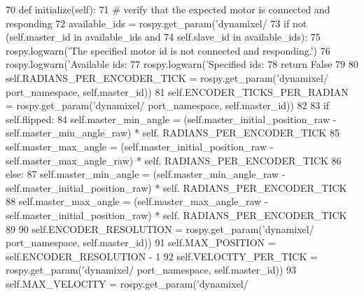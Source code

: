 \begin{DoxyCode}
70     \textcolor{keyword}{def }initialize(self):
71         \textcolor{comment}{# verify that the expected motor is connected and responding}
72         available\_ids = rospy.get\_param(\textcolor{stringliteral}{'dynamixel/%
73         \textcolor{keywordflow}{if} \textcolor{keywordflow}{not} (self.master\_id \textcolor{keywordflow}{in} available\_ids \textcolor{keywordflow}{and}
74                 self.slave\_id \textcolor{keywordflow}{in} available\_ids):
75             rospy.logwarn(\textcolor{stringliteral}{'The specified motor id is not connected and responding.'})
76             rospy.logwarn(\textcolor{stringliteral}{'Available ids: %
77             rospy.logwarn(\textcolor{stringliteral}{'Specified ids: %
78             \textcolor{keywordflow}{return} \textcolor{keyword}{False}
79             
80         self.RADIANS\_PER\_ENCODER\_TICK = rospy.get\_param(\textcolor{stringliteral}{'dynamixel/%
      port\_namespace, self.master\_id))
81         self.ENCODER\_TICKS\_PER\_RADIAN = rospy.get\_param(\textcolor{stringliteral}{'dynamixel/%
      port\_namespace, self.master\_id))
82         
83         \textcolor{keywordflow}{if} self.flipped:
84             self.master\_min\_angle = (self.master\_initial\_position\_raw - self.master\_min\_angle\_raw) * self.
      RADIANS\_PER\_ENCODER\_TICK
85             self.master\_max\_angle = (self.master\_initial\_position\_raw - self.master\_max\_angle\_raw) * self.
      RADIANS\_PER\_ENCODER\_TICK
86         \textcolor{keywordflow}{else}:
87             self.master\_min\_angle = (self.master\_min\_angle\_raw - self.master\_initial\_position\_raw) * self.
      RADIANS\_PER\_ENCODER\_TICK
88             self.master\_max\_angle = (self.master\_max\_angle\_raw - self.master\_initial\_position\_raw) * self.
      RADIANS\_PER\_ENCODER\_TICK
89             
90         self.ENCODER\_RESOLUTION = rospy.get\_param(\textcolor{stringliteral}{'dynamixel/%
      port\_namespace, self.master\_id))
91         self.MAX\_POSITION = self.ENCODER\_RESOLUTION - 1
92         self.VELOCITY\_PER\_TICK = rospy.get\_param(\textcolor{stringliteral}{'dynamixel/%
      port\_namespace, self.master\_id))
93         self.MAX\_VELOCITY = rospy.get\_param(\textcolor{stringliteral}{'dynamixel/%
}}}}}}}}
\end{DoxyCode}
